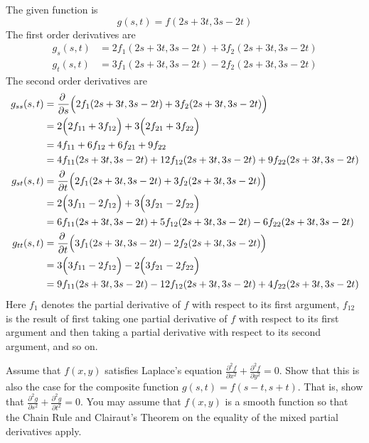 \begin{solution}
The given function is
\begin{equation*}
g(s,t)=f(2s+3t,3s-2t)
\end{equation*}
The first order derivatives are
\begin{align*}
g_s(s,t)&=2f_1(2s+3t,3s-2t)+3f_2(2s+3t,3s-2t)\\
g_t(s,t)&=3f_1(2s+3t,3s-2t)-2f_2(2s+3t,3s-2t)
\end{align*}
The second order derivatives are
\begin{align*}
g_{ss}(s,t)
      &=\pdiff{}{s}\Big(2f_1(2s+3t,3s-2t)+3f_2(2s+3t,3s-2t)\Big)\\
      &=2\Big(2f_{11}+3f_{12}\Big)
        +3\Big(2f_{21}+3f_{22}\Big)\\
      &=4f_{11}+6f_{12}+6f_{21}+9f_{22}\\
      &=4f_{11}(2s+3t,3s-2t)+12f_{12}(2s+3t,3s-2t)+9f_{22}(2s+3t,3s-2t)\\
g_{st}(s,t)&=\pdiff{}{t}\Big(2f_1(2s+3t,3s-2t)+3f_2(2s+3t,3s-2t)\Big)\\
     &=2\Big(3f_{11}-2f_{12}\Big)
        +3\Big(3f_{21}-2f_{22}\Big)\\
     &=6f_{11}(2s+3t,3s-2t)+5f_{12}(2s+3t,3s-2t)-6f_{22}(2s+3t,3s-2t)\\
g_{tt}(s,t)&=\pdiff{}{t}\Big(3f_1(2s+3t,3s-2t)-2f_2(2s+3t,3s-2t)\Big)\\
     &=3\Big(3f_{11}-2f_{12}\Big)
        -2\Big(3f_{21}-2f_{22}\Big)\\
     &=9f_{11}(2s+3t,3s-2t)-12f_{12}(2s+3t,3s-2t)+4f_{22}(2s+3t,3s-2t)
\end{align*}
Here $f_1$ denotes the partial derivative of $f$ with respect to its first
argument, $f_{12}$ is the result of first taking one partial derivative
of $f$ with respect to its first argument and then taking a partial derivative
with respect to its second argument, and so on.  

\end{solution}


\begin{question}[M200 2005D] %
Assume that $f(x,y)$ satisfies Laplace's equation 
$\frac{\partial^2 f}{\partial x^2}+\frac{\partial^2 f}{\partial y^2}=0$.
Show that this is also the case for the composite function 
$g(s,t) = f (s - t, s + t)$. That is, show that
$\frac{\partial^2 g}{\partial s^2}+\frac{\partial^2 g}{\partial t^2}=0$.
You may assume that $f(x,y)$ is a smooth function so that the 
Chain Rule and Clairaut's Theorem on the equality of the mixed partial derivatives apply.
\end{question}

